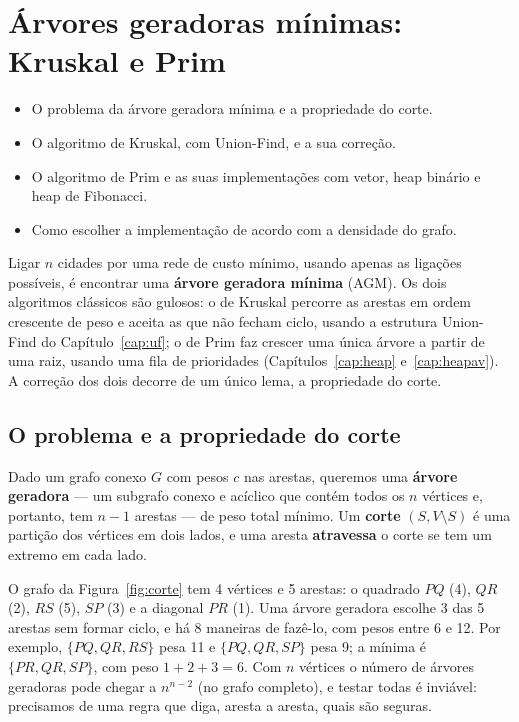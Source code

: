 \chapter{Árvores geradoras mínimas: Kruskal e Prim}\label{cap:agm}\label{sec:agm}
\begin{objetivos}
\begin{itemize}
  \item O problema da árvore geradora mínima e a propriedade do corte.
  \item O algoritmo de Kruskal, com Union-Find, e a sua correção.
  \item O algoritmo de Prim e as suas implementações com vetor, heap binário e heap de Fibonacci.
  \item Como escolher a implementação de acordo com a densidade do grafo.
\end{itemize}
\end{objetivos}

Ligar $n$ cidades por uma rede de custo mínimo, usando apenas as ligações possíveis, é encontrar uma \textbf{árvore geradora mínima} (AGM). Os dois algoritmos clássicos são gulosos: o de Kruskal percorre as arestas em ordem crescente de peso e aceita as que não fecham ciclo, usando a estrutura Union-Find do Capítulo~\ref{cap:uf}; o de Prim faz crescer uma única árvore a partir de uma raiz, usando uma fila de prioridades (Capítulos~\ref{cap:heap} e~\ref{cap:heapav}). A correção dos dois decorre de um único lema, a propriedade do corte.

\section{O problema e a propriedade do corte}\label{sec:corte}
Dado um grafo conexo $G$ com pesos $c$ nas arestas, queremos uma \textbf{árvore geradora} --- um subgrafo conexo e acíclico que contém todos os $n$ vértices e, portanto, tem $n-1$ arestas --- de peso total mínimo. Um \textbf{corte} $(S,V\setminus S)$ é uma partição dos vértices em dois lados, e uma aresta \textbf{atravessa} o corte se tem um extremo em cada lado.

\begin{exemplo}\label{ex:agmpequena}
O grafo da Figura~\ref{fig:corte} tem 4 vértices e 5 arestas: o quadrado $PQ$ (4), $QR$ (2), $RS$ (5), $SP$ (3) e a diagonal $PR$ (1). Uma árvore geradora escolhe 3 das 5 arestas sem formar ciclo, e há 8 maneiras de fazê-lo, com pesos entre 6 e 12. Por exemplo, $\{PQ,QR,RS\}$ pesa 11 e $\{PQ,QR,SP\}$ pesa 9; a mínima é $\{PR,QR,SP\}$, com peso $1+2+3=6$. Com $n$ vértices o número de árvores geradoras pode chegar a $n^{n-2}$ (no grafo completo), e testar todas é inviável: precisamos de uma regra que diga, aresta a aresta, quais são seguras.
\end{exemplo}

